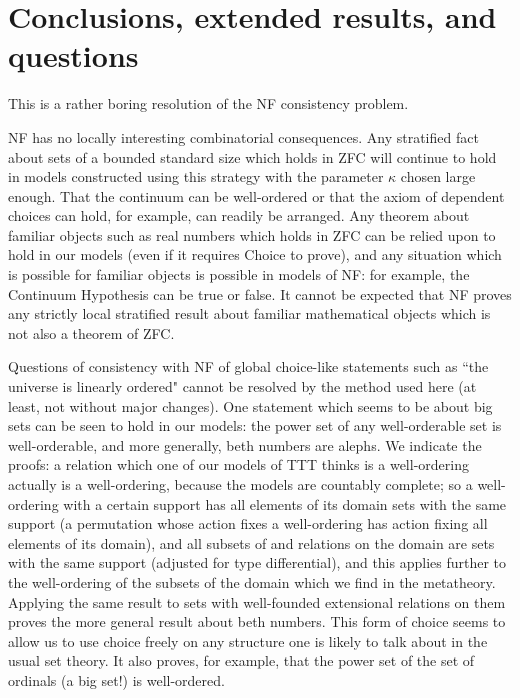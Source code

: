 \documentclass[112pt]{article}
\theoremstyle{definition}
\theoremstyle{remark}
\begin{document}
\newpage

\section{Conclusions, extended results, and questions}


This is a rather boring resolution of the NF consistency problem.

NF has no locally interesting combinatorial consequences.   Any stratified fact about sets of a bounded standard size which holds in ZFC will continue to hold in models constructed using this strategy with the parameter $\kappa$ chosen large enough.
That the continuum can be well-ordered or that the axiom of dependent choices can hold, for example, can readily be arranged.  Any theorem about familiar objects such as real numbers which holds in ZFC can be relied upon to hold in our models
(even if it requires Choice to prove), and any situation which is possible for familiar objects is possible in models of NF:  for example, the Continuum Hypothesis can be true or false.  It cannot be expected that NF proves any strictly local stratified result about familiar mathematical objects which is not also a theorem of ZFC.

Questions of consistency with NF of global choice-like statements such as ``the universe is linearly ordered"  cannot be resolved by the method used here (at least, not without major changes).  One statement which seems to be about big sets can be seen to hold in our models:  the power set of any well-orderable set is well-orderable, and more generally, beth numbers are alephs.  We indicate the proofs:  a relation which one of our models of TTT thinks is a well-ordering actually is a well-ordering, because the models are countably complete;  so a well-ordering with a certain support has all elements of its domain sets with the same support (a permutation whose action fixes a well-ordering has action fixing all elements of its domain), and all subsets of and relations on the domain are sets with the same support (adjusted for type differential), and this applies further to the well-ordering of the subsets of the domain which we find in the metatheory.  Applying the same result to sets with well-founded extensional relations on them proves the more general result about beth numbers.  This form of choice seems to allow us to use choice freely on any structure one is likely to talk about in the usual set theory.  It also proves, for example, that the power set of the set of ordinals (a big set!) is well-ordered.
\end{document}
